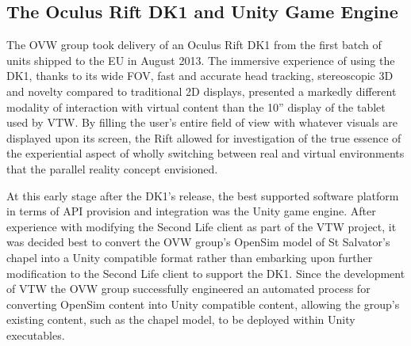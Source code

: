 


\subsection{The Oculus Rift DK1 and Unity Game Engine}

The OVW group took delivery of an Oculus Rift DK1 from the first batch of units shipped to the EU in August 2013. The immersive experience of using the DK1, thanks to its wide FOV, fast and accurate head tracking, stereoscopic 3D and novelty compared to traditional 2D displays, presented a markedly different modality of interaction with virtual content than the 10'' display of the tablet used by VTW. By filling the user's entire field of view with whatever visuals are displayed upon its screen, the Rift allowed for investigation of the true essence of the experiential aspect of wholly switching between real and virtual environments that the parallel reality concept envisioned.

At this early stage after the DK1's release, the best supported software platform in terms of API provision and integration was the Unity game engine. After experience with modifying the Second Life client as part of the VTW project, it was decided best to convert the OVW group's OpenSim model of St Salvator's chapel into a Unity compatible format rather than embarking upon further modification to the Second Life client to support the DK1. Since the development of VTW the OVW group successfully engineered an automated process for converting OpenSim content into Unity compatible content, allowing the group's existing content, such as the chapel model, to be deployed within Unity executables.

